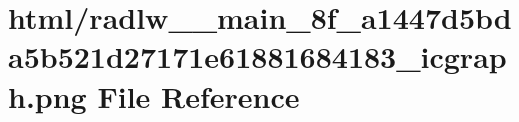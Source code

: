 \hypertarget{radlw____main__8f__a1447d5bda5b521d27171e61881684183__icgraph_8png}{}\section{html/radlw\+\_\+\+\_\+main\+\_\+8f\+\_\+a1447d5bda5b521d27171e61881684183\+\_\+icgraph.png File Reference}
\label{radlw____main__8f__a1447d5bda5b521d27171e61881684183__icgraph_8png}
